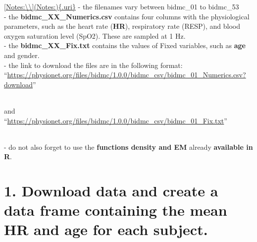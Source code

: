 \documentclass[
]{article}
\begin{document}
\href{\%5BNotes:\%5D(Notes:)\%7B.uri\%7D}{{[}Notes:\textbackslash\textbackslash{]}(Notes:)\{.uri\}}
- the filenames vary between bidmc\_01 to bidmc\_53\\
- the \textbf{bidmc\_XX\_Numerics.csv} contains four columns with the
physiological parameters, such as the heart rate (\textbf{HR}),
respiratory rate (RESP), and blood oxygen saturation level (SpO2). These
are sampled at 1 Hz.\\
- the \textbf{bidmc\_XX\_Fix.txt} contains the values of Fixed
variables, such as \textbf{age} and gender.\\
- the link to download the files are in the following format:\\
``\url{https://physionet.org/files/bidmc/1.0.0/bidmc_csv/bidmc_01_Numerics.csv?download}''\strut \\
and\\
``\url{https://physionet.org/files/bidmc/1.0.0/bidmc_csv/bidmc_01_Fix.txt}''\strut \\
- do not also forget to use the \textbf{functions density and EM}
already \textbf{available in R}.

\section{1. Download data and create a data frame containing the mean HR
and age for each
subject.}\label{download-data-and-create-a-data-frame-containing-the-mean-hr-and-age-for-each-subject.}
\end{document}
